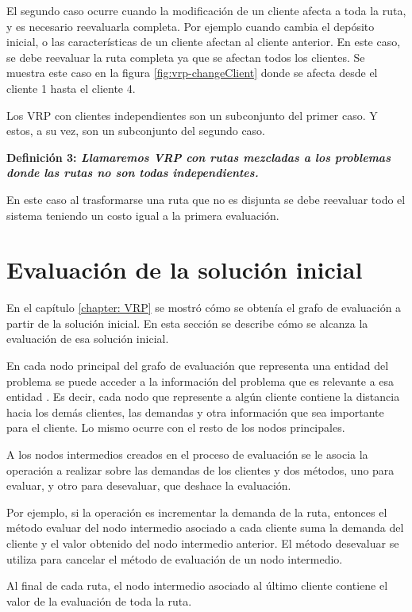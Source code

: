 El segundo caso ocurre cuando la modificación de un cliente afecta a toda la ruta, y es necesario reevaluarla completa. Por ejemplo cuando cambia el depósito inicial, o las características de un cliente afectan al cliente anterior. En este caso, se debe reevaluar la ruta completa ya que se afectan todos los clientes. Se muestra este caso en la figura \ref{fig:vrp-changeClient} donde se afecta desde el cliente 1 hasta el cliente 4.

Los VRP con clientes independientes son un subconjunto del primer caso. Y estos, a su vez, son un subconjunto del segundo caso.

\bf{Definición 3:} \it Llamaremos VRP con rutas mezcladas a los problemas donde las rutas no son todas independientes. 

\rm En este caso al trasformarse una ruta que no es disjunta se debe reevaluar todo el sistema teniendo un costo igual a la primera evaluación. 

\section{Evaluación de la solución inicial}\label{3:init-Solution}
En el capítulo \ref{chapter: VRP} se mostró cómo se obtenía el grafo de evaluación a partir de la solución inicial. En esta sección se describe cómo se alcanza la evaluación de esa solución inicial.

En cada nodo principal del grafo de evaluación que representa una entidad del problema se puede acceder a la  información del problema que es relevante a esa entidad \cite{JJ}. Es decir, cada nodo que represente a algún cliente contiene la distancia hacia los demás clientes, las demandas y otra información que sea importante para el cliente. Lo mismo ocurre con el resto de los nodos principales.

A los nodos intermedios creados en el proceso de evaluación se le asocia la operación a realizar sobre las demandas de los clientes y dos métodos, uno para evaluar, y otro para desevaluar, que deshace la evaluación. 

Por ejemplo, si la operación es incrementar la demanda de la ruta, entonces el método evaluar del nodo intermedio asociado a cada cliente suma la demanda del cliente y el valor obtenido del nodo intermedio anterior. El método desevaluar se utiliza para cancelar el método de evaluación de un nodo intermedio.

Al final de cada ruta, el nodo intermedio asociado al último cliente contiene el valor de la evaluación de toda la ruta.


